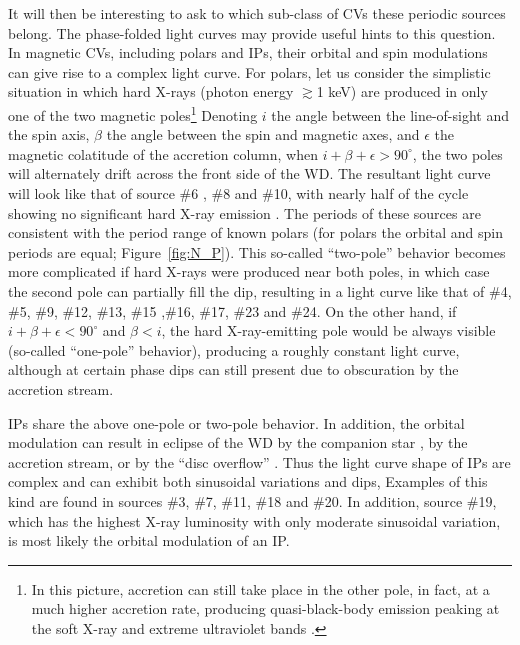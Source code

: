 \documentclass[fleqn,usenatbib]{mnras}
\begin{document}
It will then be interesting to ask to which sub-class of CVs these periodic sources belong. The phase-folded light curves may provide useful hints to this question. 
In magnetic CVs, including polars and IPs, their orbital and spin modulations can give rise to a complex light curve. For polars, let us consider the simplistic situation in which hard X-rays (photon energy $\gtrsim$1 keV) are produced in only one of the two magnetic poles\footnote{In this picture, accretion can still take place in the other pole, in fact, at a much higher accretion rate, producing quasi-black-body emission peaking at the soft X-ray and extreme ultraviolet bands \citep{2001cvs..book.....H}.} 
Denoting $i$ the angle between the line-of-sight and the spin axis, $\beta$ the angle between the spin and magnetic axes, and $\epsilon$ the magnetic colatitude of the accretion column, when $i+\beta+\epsilon > 90^{\circ}$, the two poles will alternately drift across the front side of the WD. 
The resultant light curve will look like that of source \#6 , \#8 and \#10, with nearly half of the cycle showing no significant hard X-ray emission \citep{1985A&A...148L..14H}. 
The periods of these sources are consistent with the period range of known polars (for polars the orbital and spin periods are equal; Figure~\ref{fig:N_P}).
This so-called ``two-pole'' behavior becomes more complicated if hard X-rays were produced near both poles, in which case the second pole can partially fill the dip, resulting in a light curve like that of \#4, \#5, \#9, \#12, \#13, \#15 ,\#16, \#17, \#23 and \#24. 
On the other hand, if $i+\beta+\epsilon < 90^{\circ}$ and $\beta < i$, the hard X-ray-emitting pole would be always visible (so-called ``one-pole'' behavior), producing a roughly constant light curve, although at certain phase dips can still present due to obscuration by the accretion stream.

IPs share the above one-pole or two-pole behavior. 
In addition, the orbital modulation can result in eclipse of the WD by the companion star \citep{1993MNRAS.260..299H}, by the accretion stream, or by the ``disc overflow'' \citep{1996MNRAS.280..937N}. 
Thus the light curve shape of IPs are complex and can exhibit both sinusoidal variations and dips,  Examples of this kind are found in sources \#3, \#7, \#11, \#18 and \#20.
In addition, source \#19, which has the highest X-ray luminosity with only moderate sinusoidal variation, is most likely the orbital modulation of an IP.
\end{document}
